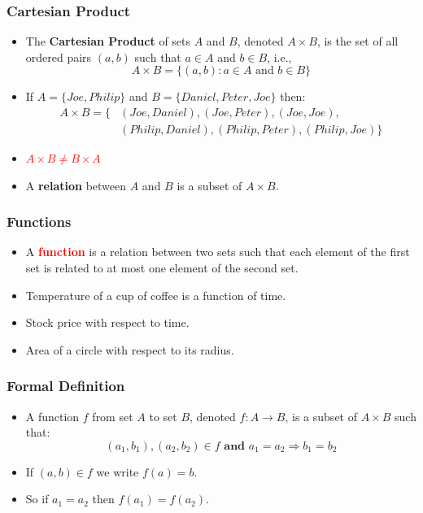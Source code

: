 \documentclass[12pt,aspectratio=169]{beamer}
\begin{document}
\begin{frame}
\frametitle{Cartesian Product}
\begin{itemize}
\item The \textbf{Cartesian Product} of sets $A$ and $B$, denoted $A\times B$, 
is the set of all ordered pairs $(a,b)$ such that $a\in A$ and $b\in B$, i.e.,\pause
\[
A\times B=\{(a,b):a\in A\text{ and } b\in B\}
\] 
\pause
\item If $A=\{Joe, Philip\}$ and $B=\{Daniel, Peter, Joe\}$ then: \pause
\[
\begin{aligned}
A\times B = \{&(Joe, Daniel), (Joe, Peter), (Joe, Joe),\\
& (Philip, Daniel),(Philip, Peter), (Philip, Joe)\}
\end{aligned}
\]
\pause
\item \textcolor{red}{$A\times B \neq B\times A$}
\bigskip \pause
\item A \textbf{relation} between $A$ and $B$ is a subset of $A\times B$.

\end{itemize}
\end{frame}

\begin{frame}
\frametitle{Functions}
\begin{itemize}
\item A \textcolor{red}{\textbf{function}} is a relation between two sets such that each element of the first set is related to at most one element of the second set. \pause
\bigskip
\item Temperature of a cup of coffee is a function of time.
\bigskip
\item Stock price with respect to time.
\bigskip
\item Area of a circle with respect to its radius.
\end{itemize}
\end{frame}



\begin{frame}
\frametitle{Formal Definition}
\begin{itemize}
\item A function $f$ from set $A$ to set $B$, denoted $f:A\to B$, is a subset of $A\times B$ such that: \pause
\[
(a_1,b_1),(a_2,b_2)\in f \textbf{ and } a_1=a_2\Longrightarrow b_1=b_2
\]
\bigskip\pause
\item If $(a,b)\in f$ we write $f(a)=b$.
\bigskip \pause
\item So if $a_1=a_2$ then $f(a_1)=f(a_2)$.
\end{itemize}
\end{frame}
\end{document}
